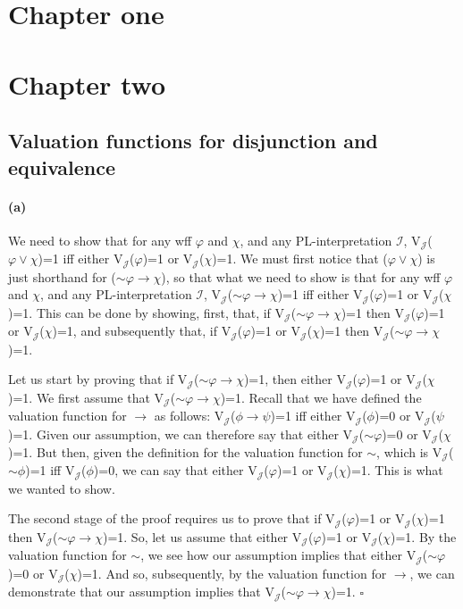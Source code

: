 \documentclass[sloppy, journal, git, bytitle]{humapap}
\begin{document}
\documenttitle

\section{Chapter one}
\section{Chapter two}
\subsection{Valuation functions for disjunction and equivalence}
\paragraph{(a)} We need to show that for any wff $\varphi$ and $\chi$, 
and any PL-interpretation $\mathcal{I}$, 
V$\mathcal{_J}$($\varphi\vee\chi$)=1 iff either V$\mathcal{_J}$($\varphi$)=1 or V$\mathcal{_J}$($\chi$)=1. 
We must first notice that ($\varphi \vee \chi$) is just shorthand for ($\sim\varphi\rightarrow\chi$), 
so that what we need to show is that for any wff $\varphi$ and $\chi$, 
and any PL-interpretation $\mathcal{I}$, V$\mathcal{_J}$($\sim\varphi\rightarrow\chi$)=1 iff either V$\mathcal{_J}$($\varphi$)=1 or V$\mathcal{_J}$($\chi$)=1. 
This can be done by showing, first, that, 
if V$\mathcal{_J}$($\sim\varphi\rightarrow\chi$)=1 then V$\mathcal{_J}$($\varphi$)=1 or V$\mathcal{_J}$($\chi$)=1, 
and subsequently that, if V$\mathcal{_J}$($\varphi$)=1 or V$\mathcal{_J}$($\chi$)=1 then V$\mathcal{_J}$($\sim\varphi \rightarrow\chi$)=1.

Let us start by proving that if V$\mathcal{_J}$($\sim\varphi\rightarrow\chi$)=1, 
then either V$\mathcal{_J}$($\varphi$)=1 or V$\mathcal{_J}$($\chi$)=1. 
We first assume that V$\mathcal{_J}$($\sim\varphi\rightarrow\chi$)=1. 
Recall that we have defined the valuation function for $\rightarrow$ as follows: 
V$\mathcal{_J}$($\phi\rightarrow\psi$)=1 iff either V$\mathcal{_J}$($\phi$)=0 or V$\mathcal{_J}$($\psi$)=1. 
Given our assumption, we can therefore say that either V$\mathcal{_J}$($\sim\varphi$)=0 or V$\mathcal{_J}$($\chi$)=1. 
But then, given the definition for the valuation function for $\sim$, 
which is V$\mathcal{_J}$($\sim\phi$)=1 iff V$\mathcal{_J}$($\phi$)=0, 
we can say that either V$\mathcal{_J}$($\varphi$)=1 or V$\mathcal{_J}$($\chi$)=1. 
This is what we wanted to show.

The second stage of the proof requires us to prove that 
if V$\mathcal{_J}$($\varphi$)=1 or V$\mathcal{_J}$($\chi$)=1 then V$\mathcal{_J}$($\sim\varphi\rightarrow\chi$)=1. 
So, let us assume that either V$\mathcal{_J}$($\varphi$)=1 or V$\mathcal{_J}$($\chi$)=1. 
By the valuation function for $\sim$, 
we see how our assumption implies that either  V$\mathcal{_J}$($\sim\varphi$)=0 or V$\mathcal{_J}$($\chi$)=1. 
And so, subsequently, by the valuation function for $\rightarrow$, 
we can demonstrate that our assumption implies that V$\mathcal{_J}$($\sim\varphi\rightarrow\chi$)=1. $\square$
\end{document}
